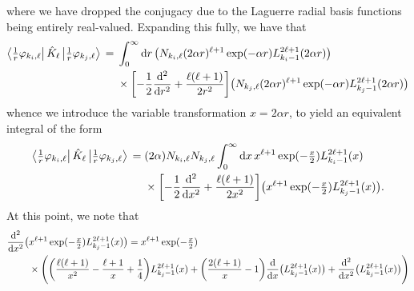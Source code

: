 \documentclass[]{article}
\begin{document}
where we have dropped the conjugacy due to the Laguerre radial basis functions
being entirely real-valued.
Expanding this fully, we have that
\begin{alignat*}{2}
  \bra{\tfrac{1}{r}\varphi_{k_{i}, \ell}}
  \hat{K}_{\ell}
  \ket{\tfrac{1}{r}\varphi_{k_{j}, \ell}}
  {}={}
  &
  \int_{0}^{\infty}
  \dd{r}
  \lr[\big]
  {
    N_{k_{i}, \ell}
    \lr
    {
      2
      \alpha
      r
    }^{\ell + 1}
    \exponential\lr
    {
      -
      \alpha
      r
    }
    L_{k_{i} - 1}^{2 \ell + 1}\lr{2 \alpha r}
  }
  \\
  &
  {}\times{}
  \lrsq[\bigg]
  {
    -
    \dfrac{1}{2}
    \dv[2]{r}
    +
    \dfrac
    {
      \ell
      \lr{\ell + 1}
    }
    {
      2
      r^{2}
    }
  }
  \lr[\big]
  {
    N_{k_{j}, \ell}
    \lr
    {
      2
      \alpha
      r
    }^{\ell + 1}
    \exponential\lr
    {
      -
      \alpha
      r
    }
    L_{k_{j} - 1}^{2 \ell + 1}\lr{2 \alpha r}
  }
\end{alignat*}
whence we introduce the variable transformation $x = 2 \alpha r$, to yield an
equivalent integral of the form
\begin{alignat*}{2}
  \bra{\tfrac{1}{r}\varphi_{k_{i}, \ell}}
  \hat{K}_{\ell}
  \ket{\tfrac{1}{r}\varphi_{k_{j}, \ell}}
  {}={}
  &
  \lr{2 \alpha}
  N_{k_{i}, \ell}
  N_{k_{j}, \ell}
  \int_{0}^{\infty}
  \dd{x}
  x^{\ell + 1}
  \exponential\lr{-\tfrac{x}{2}}
  L_{k_{i} - 1}^{2 \ell + 1}\lr{x}
  \\
  &
  {}\times{}
  \lrsq[\bigg]
  {
    -
    \dfrac{1}{2}
    \dv[2]{x}
    +
    \dfrac
    {
      \ell
      \lr{\ell + 1}
    }
    {
      2
      x^{2}
    }
  }
  \lr[\big]
  {
    x^{\ell + 1}
    \exponential\lr{-\tfrac{x}{2}}
    L_{k_{j} - 1}^{2 \ell + 1}\lr{x}
  }
  .
\end{alignat*}
At this point, we note that
\begin{alignat*}{2}
  \dv[2]{x}
  \lr[\big]
  {
    &
    x^{\ell + 1}
    \exponential\lr{-\tfrac{x}{2}}
    L_{k_{j} - 1}^{2 \ell + 1}\lr{x}
  }
  {}={}
  x^{\ell + 1}
  \exponential\lr{-\tfrac{x}{2}}
  \\
  &
  {}\times{}
  \lr[\Bigg]
  {
    \lr[\bigg]
    {
      \dfrac
      {
        \ell
        \lr{\ell + 1}
      }
      {
        x^{2}
      }
      -
      \dfrac
      {
        \ell + 1
      }
      {
        x
      }
      +
      \dfrac{1}{4}
    }
    L_{k_{j} - 1}^{2 \ell + 1}\lr{x}
    +
    \lr[\bigg]
    {
      \dfrac
      {
        2
        \lr{\ell + 1}
      }
      {
        x
      }
      -
      1
    }
    \dv{x}
    \lr[\big]
    {
      L_{k_{j} - 1}^{2 \ell + 1}\lr{x}
    }
    +
    \dv[2]{x}
    \lr[\big]
    {
      L_{k_{j} - 1}^{2 \ell + 1}\lr{x}
    }
  }
\end{alignat*}
\end{document}
